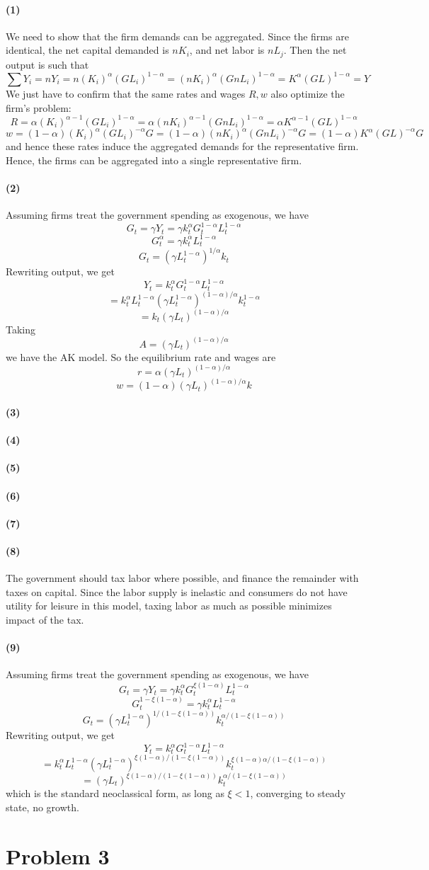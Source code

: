 \documentclass[10pt,letter]{article}
\newcommand{\problem}[1]{\section*{Problem #1}}
\newcommand{\problempart}[1]{\paragraph{#1}}
\begin{document}
\problempart{(1)}
We need to show that the firm demands can be aggregated. Since the firms are identical, the net capital demanded is $nK_i$, and net labor is $nL_j$. Then the net output is such that
\[ \sum Y_i = nY_i = n(K_i)^\alpha(GL_i)^{1-\alpha} = (nK_i)^\alpha(GnL_i)^{1-\alpha} = K^\alpha (GL)^{1-\alpha} = Y \]
We just have to confirm that the same rates and wages $R, w$ also optimize the firm's problem:
\[ R = \alpha (K_i)^{\alpha - 1}(GL_i)^{1-\alpha} = \alpha (nK_i)^{\alpha - 1}(GnL_i)^{1-\alpha} = \alpha K^{\alpha - 1}(GL)^{1-\alpha}\]
\[ w = (1-\alpha) (K_i)^{\alpha}(GL_i)^{-\alpha}G = (1-\alpha) (nK_i)^{\alpha}(GnL_i)^{-\alpha}G= (1-\alpha) K^{\alpha}(GL)^{-\alpha}G\]
and hence these rates induce the aggregated demands for the representative firm. Hence, the firms can be aggregated into a single representative firm.
\problempart{(2)}
Assuming firms treat the government spending as exogenous, we have
\[ G_t = \gamma Y_t = \gamma k_t^\alpha G_t^{1-\alpha} L_t^{1-\alpha} \]
\[ G_t ^\alpha = \gamma k_t^\alpha L_t^{1-\alpha} \]
\[ G_t = (\gamma L_t^{1-\alpha})^{1/\alpha} k_t \]
Rewriting output, we get
\[ Y_t =k_t^\alpha G_t^{1-\alpha} L_t^{1-\alpha} \]\[=  k_t^\alpha L_t^{1-\alpha} (\gamma L_t^{1-\alpha})^{(1-\alpha)/\alpha} k_t^{1-\alpha} \]
\[ = k_t (\gamma L_t)^{(1-\alpha)/\alpha} \]
Taking \[ A = (\gamma L_t)^{(1-\alpha)/\alpha} \]
we have the AK model.
So the equilibrium rate and wages are
\[ r = \alpha (\gamma L_t)^{(1-\alpha)/\alpha} \]
\[ w = (1-\alpha) (\gamma L_t)^{(1-\alpha)/\alpha} k \]
\problempart{(3)}

\problempart{(4)}
\problempart{(5)}
\problempart{(6)}
\problempart{(7)}
\problempart{(8)}
The government should tax labor where possible, and finance the remainder with taxes on capital. Since the labor supply is inelastic and consumers do not have utility for leisure in this model, taxing labor as much as possible minimizes impact of the tax.
\problempart{(9)}

Assuming firms treat the government spending as exogenous, we have
\[ G_t = \gamma Y_t = \gamma k_t^\alpha G_t^{\xi(1-\alpha)} L_t^{1-\alpha} \]
\[ G_t ^{1 - \xi(1-\alpha)} = \gamma k_t^\alpha L_t^{1-\alpha} \]
\[ G_t = (\gamma L_t^{1-\alpha})^{1/(1 - \xi(1-\alpha))} k_t^{\alpha/(1 - \xi(1-\alpha))} \]
Rewriting output, we get
\[ Y_t =k_t^\alpha G_t^{1-\alpha} L_t^{1-\alpha} \]
\[=  k_t^\alpha L_t^{1-\alpha} (\gamma L_t^{1-\alpha})^{\xi(1-\alpha)/(1 - \xi(1-\alpha))} k_t^{\xi(1-\alpha)\alpha/(1 - \xi(1-\alpha))} \]
\[ = (\gamma L_t)^{\xi(1-\alpha)/(1 - \xi(1-\alpha))} k_t^{\alpha /(1 - \xi(1-\alpha))} \]
which is the standard neoclassical form, as long as $\xi < 1$, converging to steady state, no growth.
\pagebreak
\problem{3}
\end{document}
